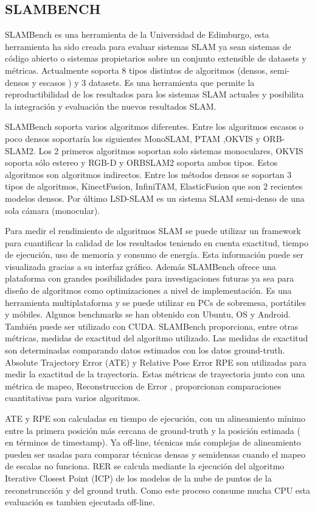 \subsection{SLAMBENCH}
SLAMBench es una herramienta de la Universidad de Edimburgo, esta herramienta ha sido creada para evaluar sistemas SLAM ya sean sistemas de código abierto o sistemas propietarios sobre un conjunto extensible de datasets y métricas. \cite{Bodin2018}
Actualmente soporta 8 tipos distintos de algoritmos (densos, semi-densos y escasos ) y 3 datasets. Es una herramienta que permite la reproductibilidad de los resultados para los sistemas SLAM actuales y posibilita la integración y evaluación the nuevos resultados SLAM.

SLAMBench soporta varios algoritmos diferentes. Entre los algoritmos escasos o poco densos soportaría los siguientes MonoSLAM, PTAM ,OKVIS y ORB-SLAM2. Los 2 primeros algoritmos soportan solo sistemas monoculares, OKVIS soporta sólo estereo y RGB-D y ORBSLAM2 soporta ambos tipos. Estos algoritmos son algoritmos indirectos.
Entre los métodos densos se soportan 3 tipos de algoritmos, KinectFusion, InfiniTAM, ElasticFusion que son 2 recientes modelos densos. Por último LSD-SLAM es un sistema SLAM semi-denso de una sola cámara (monocular).

Para medir el rendimiento de algoritmos SLAM se puede utilizar un framework para cuantificar la calidad de los resultados teniendo en cuenta exactitud, tiempo de ejecución, uso de memoria y consumo de energía. Esta información puede ser visualizada gracias a su interfaz gráfico.
Además SLAMBench ofrece una plataforma con grandes posibilidades para investigaciones futuras ya sea para diseño de algoritmos como optimizaciones a nivel de implementación. Es una herramienta multiplataforma y se puede utilizar en PCs de sobremesa, portátiles y móbiles. Algunos benchmarks se han obtenido con Ubuntu, OS y Android.
También puede ser utilizado con CUDA.
SLAMBench proporciona, entre otras métricas, medidas de exactitud del algoritmo utilizado. Las medidas de exactitud son determinadas comparando datos estimados con los datos ground-truth.
Absolute Trajectory Error (ATE) y Relative Pose Error RPE son utilizadas para medir la exactitud de la trayectoria. Estas métricas de trayectoria junto con una métrica de mapeo, Reconstruccion de Error , proporcionan comparaciones cuantitativas para varios algoritmos.

ATE y RPE son calculadas en tiempo de ejecución, con un alineamiento mínimo entre la primera posición más cercana de ground-truth y la posición estimada ( en términos de timestamp). Ya off-line, técnicas más complejas de alineamiento pueden ser usadas para comparar técnicas densas y semidensas cuando el mapeo de escalas no funciona. RER se calcula mediante la ejecución del algoritmo Iterative Closest Point (ICP) de los modelos de la nube de puntos de la reconstruncción y del ground truth. Como este proceso consume mucha CPU esta evaluación es tambien ejecutada off-line.


